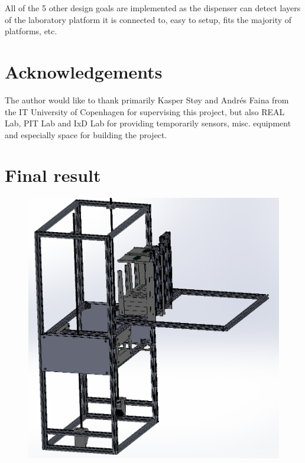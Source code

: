 \documentclass[10pt,a4paper]{article}
\begin{document}
	All of the 5 other design goals are implemented as the dispenser can detect layers of the laboratory platform it is connected to, easy to setup, fits the majority of platforms, etc.
		
	
	
	
	\section{Acknowledgements}
	The author would like to thank primarily Kasper Støy and Andrés Faina from the IT University of Copenhagen for supervising this project, but also REAL Lab, PIT Lab and IxD Lab for providing temporarily sensors, misc. equipment and especially space for building the project.
	
	
	\newpage
	
	
	\newpage
	
	\appendix
	\section{Final result}\label{app:finalResult}
	\begin{figure}
		\includegraphics[width=15cm]{images/completeModule.png}
	\end{figure}
		
\end{document}

